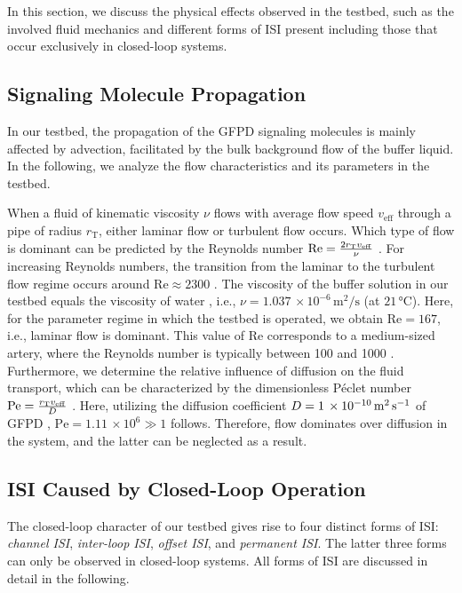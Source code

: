In this section, we discuss the physical effects observed in the testbed, such as the involved fluid mechanics and different forms of \ac{ISI} present including those that occur exclusively in closed-loop systems.
%
\scaleSubsection
\subsection{Signaling Molecule Propagation}\label{subsec:propagation}
\scaleSubsectionBelow
%
In our testbed, the propagation of the \ac{GFPD} signaling molecules is mainly affected by advection, facilitated by the bulk background flow of the buffer liquid. In the following, we analyze the flow characteristics and its parameters in the testbed.

When a fluid of kinematic viscosity $\nu$ flows with average flow speed $v_{\mathrm{eff}}$ through a pipe of radius $r_\mathrm{T}$, either laminar flow or turbulent flow occurs. 
Which type of flow is dominant can be predicted by the Reynolds number $\text{Re} = \frac{2 r_\mathrm{T} v_{\mathrm{eff}}}{\nu}$ \cite[p. 14]{darby2017chemical}. For increasing Reynolds numbers, the transition from the laminar to the turbulent flow regime occurs around $\text{Re} \approx 2300$ \cite[p. 12]{schlichting2016boundary}. The viscosity of the buffer solution in our testbed equals the viscosity of water \cite{hink2000structural}, i.e., $\nu = 1.037\, \times 10^{-6} \,\si{ \meter \squared \per \second}$ (at $21\, \si{\celsius}$). 
Here, for the parameter regime in which the testbed is operated, we obtain $\text{Re} = 167$, i.e., laminar flow is dominant. This value of $\text{Re}$ corresponds to a medium-sized artery, where the Reynolds number is typically between 100 and 1000 \cite{caro2012mechanics}.
Furthermore, we determine the relative influence of diffusion on the fluid transport, which can be characterized by the dimensionless Péclet number $\text{Pe} = \frac{r_\mathrm{T} v_{\mathrm{eff}}}{D}$ \cite[eq. (4.44)]{tabeling2023introduction}. Here, utilizing the diffusion coefficient $ D = 1\, \times 10^{-10} \,\si{\meter\squared \per \second}$ of \ac{GFPD} \cite{Junghans2016DiffusionGFPD}, $\text{Pe} = 1.11\, \times 10^{6} \gg 1$ follows. Therefore, flow dominates over diffusion in the system, and the latter can be neglected as a result.
%
\scaleSubsection
\subsection{ISI Caused by Closed-Loop Operation}\label{SubSec:ISI}
\scaleSubsectionBelow
%
The closed-loop character of our testbed gives rise to four distinct forms of \ac{ISI}: \textit{channel \ac{ISI}}, \textit{inter-loop \ac{ISI}}, \textit{offset \ac{ISI}}, and \textit{permanent \ac{ISI}}. The latter three forms can only be observed in closed-loop systems. 
All forms of \ac{ISI} are discussed in detail in the following. 
%
\scaleSubsubsection
